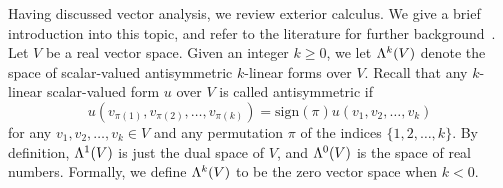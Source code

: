 \documentclass[12pt,a4paper]{article}
\begin{document}
Having discussed vector analysis, we review exterior calculus. 
We give a brief introduction into this topic, and refer to the literature for further background~\cite{lee2012smooth}. 
Let $V$ be a real vector space. 
Given an integer $k \geq 0$, we let $\Lambda^{k}(V)$ denote the space of scalar-valued antisymmetric $k$-linear forms over $V$. 
Recall that any $k$-linear scalar-valued form $u$ over $V$ is called antisymmetric
if 
\[ 
    u( v_{\pi(1)}, v_{\pi(2)}, \ldots, v_{\pi(k)} ) 
    = 
    \text{sign}(\pi) 
    u( v_1, v_2, \ldots, v_k ) 
\]
for any $v_1, v_2, \dots, v_k \in V$ and any permutation $\pi$ of the indices \(\{1, 2, \ldots, k\}\). 
By definition, $\Lambda^{1}(V)$ is just the dual space of $V$, and $\Lambda^{0}(V)$ is the space of real numbers. 
Formally, we define $\Lambda^{k}(V)$ to be the zero vector space when $k < 0$. 
\end{document}
